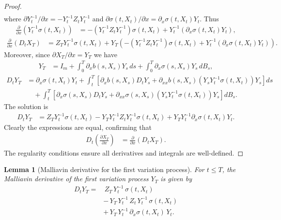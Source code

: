 \documentclass[]{interact}
\newcommand{\1}{\mathbf{1}}
\theoremstyle{plain}%
\newtheorem{lemma}[theorem]{Lemma}
\theoremstyle{definition}
\theoremstyle{remark}
\numberwithin{equation}{section}
\begin{document}
\begin{proof}
\begin{align*}
\end{align*}
where \(\partial Y_t^{-1}/\partial x = - Y_t^{-1} Z_t Y_t^{-1}\) and \(\partial \sigma(t, X_t)/\partial x = \partial_x \sigma(t, X_t) Y_t\). Thus
\begin{align*}
\frac{\partial}{\partial x} \left( Y_t^{-1} \sigma(t, X_t) \right) &= - \left( Y_t^{-1} Z_t Y_t^{-1} \right) \sigma(t, X_t) + Y_t^{-1} \left( \partial_x \sigma(t, X_t) Y_t \right),
\end{align*}
\begin{align*}
\frac{\partial}{\partial x} (D_t X_T) &= Z_T Y_t^{-1} \sigma(t, X_t) + Y_T \left( - \left( Y_t^{-1} Z_t Y_t^{-1} \right) \sigma(t, X_t) + Y_t^{-1} \left( \partial_x \sigma(t, X_t) Y_t \right) \right).
\end{align*}
%
Moreover, since \(\partial X_T/\partial x = Y_T\) we have
\begin{align*}
Y_T &= I_m + \int_0^T \partial_x b(s, X_s) Y_s \, ds + \int_0^T \partial_x \sigma(s, X_s) Y_s \, dB_s,
\end{align*}
\begin{align*}
D_t Y_T &= \partial_x \sigma(t, X_t) Y_t + \int_t^T \left[ \partial_x b(s, X_s) D_t Y_s + \partial_{xx} b(s, X_s) \left( Y_s Y_t^{-1} \sigma(t, X_t) \right) Y_s \right] ds \\
&\quad + \int_t^T \left[ \partial_x \sigma(s, X_s) D_t Y_s + \partial_{xx} \sigma(s, X_s) \left( Y_s Y_t^{-1} \sigma(t, X_t) \right) Y_s \right] dB_s.
\end{align*}
The solution is
\begin{align*}
D_t Y_T &= Z_T Y_t^{-1} \sigma(t, X_t) - Y_T Y_t^{-1} Z_t Y_t^{-1} \sigma(t, X_t) + Y_T Y_t^{-1} \partial_x \sigma(t, X_t) Y_t.
\end{align*}
%
Clearly the expressions are equal, confirming that
\begin{align*}
D_t \left( \frac{\partial X_T}{\partial x} \right) &= \frac{\partial}{\partial x} \left( D_t X_T \right).
\end{align*}
The regularity conditions ensure all derivatives and integrals are well-defined.

\end{proof}




\begin{lemma}[Malliavin derivative for the first variation process]
\label{lemma:DtYT}
For \( t \leq T \), the Malliavin derivative of the first variation process \( Y_T \) is given by
\begin{align*}
D_t Y_T = &\,Z_T\,Y_t^{-1}\,\sigma(t, X_t) \\
&-\, Y_T\,Y_t^{-1}\,Z_t\,Y_t^{-1}\,\sigma(t, X_t) \\
&+\, Y_T\,Y_t^{-1}\,\partial_x \sigma(t, X_t)\,Y_t.
\end{align*}
\end{lemma}
\end{document}
